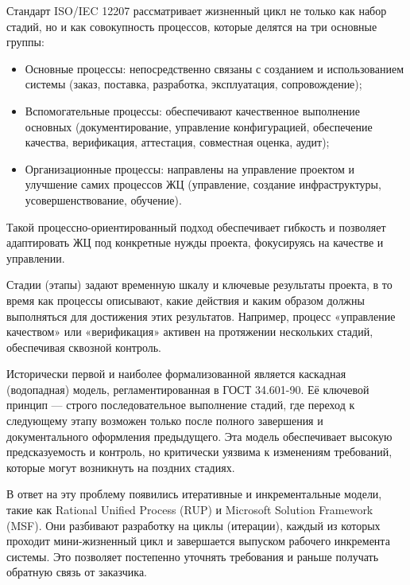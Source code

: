 \documentclass{SibFU-docs}
\begin{document}

Стандарт ISO/IEC 12207 рассматривает жизненный цикл не только как набор стадий, но и как совокупность процессов, которые делятся на три основные группы:
\begin{itemize}[label=-]
\item Основные процессы: непосредственно связаны с созданием и использованием системы (заказ, поставка, разработка, эксплуатация, сопровождение);
\item Вспомогательные процессы: обеспечивают качественное выполнение основных (документирование, управление конфигурацией, обеспечение качества, верификация, аттестация, совместная оценка, аудит);
\item Организационные процессы: направлены на управление проектом и улучшение самих процессов ЖЦ (управление, создание инфраструктуры, усовершенствование, обучение).
\end{itemize}

\vspace{1em}

Такой процессно-ориентированный подход обеспечивает гибкость и позволяет адаптировать ЖЦ под конкретные нужды проекта, фокусируясь на качестве и управлении. \cite{ISO12207_2017}


Стадии (этапы) задают временную шкалу и ключевые результаты проекта, в то время как процессы описывают, какие действия и каким образом должны выполняться для достижения этих результатов. Например, процесс «управление качеством» или «верификация» активен на протяжении нескольких стадий, обеспечивая сквозной контроль.


Исторически первой и наиболее формализованной является каскадная (водопадная) модель, регламентированная в ГОСТ 34.601-90. Её ключевой принцип — строго последовательное выполнение стадий, где переход к следующему этапу возможен только после полного завершения и документального оформления предыдущего. Эта модель обеспечивает высокую предсказуемость и контроль, но критически уязвима к изменениям требований, которые могут возникнуть на поздних стадиях.

В ответ на эту проблему появились итеративные и инкрементальные модели, такие как Rational Unified Process (RUP) и Microsoft Solution Framework (MSF). Они разбивают разработку на циклы (итерации), каждый из которых проходит мини-жизненный цикл и завершается выпуском рабочего инкремента системы. Это позволяет постепенно уточнять требования и раньше получать обратную связь от заказчика.
\end{document}
